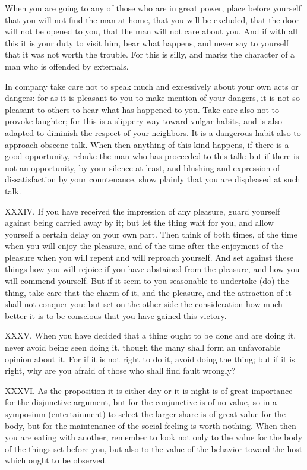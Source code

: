 When you are going to any of those who are in great power, place before yourself that you will not find the man at home, that you will be excluded, that the door will not be opened to you, that the man will not care about you. And if with all this it is your duty to visit him, bear what happens, and never say to yourself that it was not worth the trouble. For this is silly, and marks the character of a man who is offended by externals.

In company take care not to speak much and excessively about your own acts or dangers: for as it is pleasant to you to make mention of your dangers, it is not so pleasant to others to hear what has happened to you. Take care also not to provoke laughter; for this is a slippery way toward vulgar habits, and is also adapted to diminish the respect of your neighbors. It is a dangerous habit also to approach obscene talk. When then anything of this kind happens, if there is a good opportunity, rebuke the man who has proceeded to this talk: but if there is not an opportunity, by your silence at least, and blushing and expression of dissatisfaction by your countenance, show plainly that you are displeased at such talk.



XXXIV. If you have received the impression of any pleasure, guard yourself against being carried away by it; but let the thing wait for you, and allow yourself a certain delay on your own part. Then think of both times, of the time when you will enjoy the pleasure, and of the time after the enjoyment of the pleasure when you will repent and will reproach yourself. And set against these things how you will rejoice if you have abstained from the pleasure, and how you will commend yourself. But if it seem to you seasonable to undertake (do) the thing, take care that the charm of it, and the pleasure, and the attraction of it shall not conquer you: but set on the other side the consideration how much better it is to be conscious that you have gained this victory.



XXXV. When you have decided that a thing ought to be done and are doing it, never avoid being seen doing it, though the many shall form an unfavorable opinion about it. For if it is not right to do it, avoid doing the thing; but if it is right, why are you afraid of those who shall find fault wrongly?



XXXVI. As the proposition it is either day or it is night is of great importance for the disjunctive argument, but for the conjunctive is of no value, so in a symposium (entertainment) to select the larger share is of great value for the body, but for the maintenance of the social feeling is worth nothing. When then you are eating with another, remember to look not only to the value for the body of the things set before you, but also to the value of the behavior toward the host which ought to be observed.



